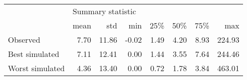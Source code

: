 \begin{tabular}{lrrrrrrr}
\toprule
{} & \multicolumn{7}{l}{Summary statistic} \\
{} &              mean &    std &   min &   25\% &   50\% &   75\% &     max \\
\midrule
Observed        &              7.70 &  11.86 & -0.02 &  1.49 &  4.20 &  8.93 &  224.93 \\
Best simulated  &              7.11 &  12.41 &  0.00 &  1.44 &  3.55 &  7.64 &  244.46 \\
Worst simulated &              4.36 &  13.40 &  0.00 &  0.72 &  1.78 &  3.84 &  463.01 \\
\bottomrule
\end{tabular}
